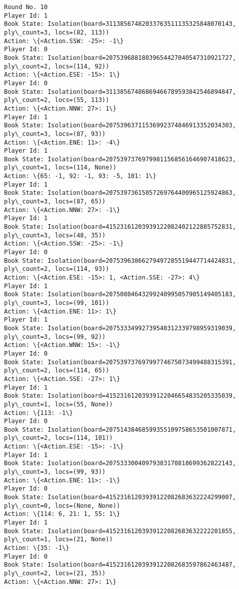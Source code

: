 \documentclass[11pt]{article}
\begin{document}
\begin{Verbatim}[commandchars=\\\{\}]
Round No. 10
Player Id: 1
Book State: Isolation(board=31138567482033763511135325848070143, ply\_count=3, locs=(82, 113))
Action: \{<Action.SSW: -25>: -1\}
Player Id: 0
Book State: Isolation(board=20753968818039654427040547310921727, ply\_count=2, locs=(114, 92))
Action: \{<Action.ESE: -15>: 1\}
Player Id: 0
Book State: Isolation(board=31138567486869466789593842546894847, ply\_count=2, locs=(55, 113))
Action: \{<Action.NNW: 27>: 1\}
Player Id: 1
Book State: Isolation(board=20753963711536992374846913352034303, ply\_count=3, locs=(87, 93))
Action: \{<Action.ENE: 11>: -4\}
Player Id: 1
Book State: Isolation(board=20753973769799811568561646907418623, ply\_count=1, locs=(114, None))
Action: \{65: -1, 92: -1, 93: -5, 101: 1\}
Player Id: 1
Book State: Isolation(board=20753973615057269764400965125924863, ply\_count=3, locs=(87, 65))
Action: \{<Action.NNW: 27>: -1\}
Player Id: 1
Book State: Isolation(board=41523161203939122082402122885752831, ply\_count=3, locs=(48, 35))
Action: \{<Action.SSW: -25>: -1\}
Player Id: 0
Book State: Isolation(board=20753963866279497285519447714424831, ply\_count=2, locs=(114, 93))
Action: \{<Action.ESE: -15>: 1, <Action.SSE: -27>: 4\}
Player Id: 1
Book State: Isolation(board=20750804643299240995057905149405183, ply\_count=3, locs=(99, 101))
Action: \{<Action.ENE: 11>: 1\}
Player Id: 1
Book State: Isolation(board=20753334992739540312339798959319039, ply\_count=3, locs=(99, 92))
Action: \{<Action.WNW: 15>: -1\}
Player Id: 0
Book State: Isolation(board=20753973769799774675073499488315391, ply\_count=2, locs=(114, 65))
Action: \{<Action.SSE: -27>: 1\}
Player Id: 1
Book State: Isolation(board=41523161203939122046654835205335039, ply\_count=1, locs=(55, None))
Action: \{113: -1\}
Player Id: 0
Book State: Isolation(board=20751438468599355109758653501007871, ply\_count=2, locs=(114, 101))
Action: \{<Action.ESE: -15>: -1\}
Player Id: 1
Book State: Isolation(board=20753330040979383170818699362822143, ply\_count=3, locs=(99, 93))
Action: \{<Action.ENE: 11>: -1\}
Player Id: 0
Book State: Isolation(board=41523161203939122082683632224299007, ply\_count=0, locs=(None, None))
Action: \{114: 6, 21: 1, 55: 1\}
Player Id: 1
Book State: Isolation(board=41523161203939122082683632222201855, ply\_count=1, locs=(21, None))
Action: \{35: -1\}
Player Id: 0
Book State: Isolation(board=41523161203939122082683597862463487, ply\_count=2, locs=(21, 35))
Action: \{<Action.NNW: 27>: 1\}


\end{Verbatim}
\end{document}
